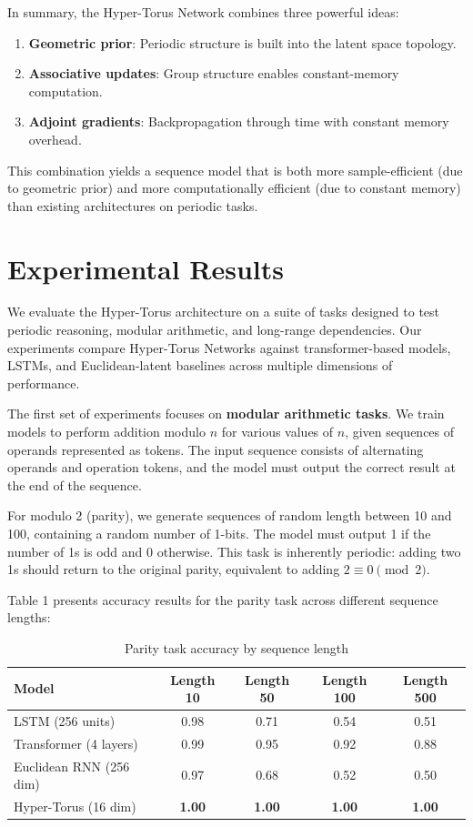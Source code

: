 \documentclass[12pt,letterpaper,twoside]{article}
\begin{document}
In summary, the Hyper-Torus Network combines three powerful ideas:
\begin{enumerate}
    \item \textbf{Geometric prior}: Periodic structure is built into the latent space topology.
    \item \textbf{Associative updates}: Group structure enables constant-memory computation.
    \item \textbf{Adjoint gradients}: Backpropagation through time with constant memory overhead.
\end{enumerate}
This combination yields a sequence model that is both more sample-efficient (due to geometric prior) and more computationally efficient (due to constant memory) than existing architectures on periodic tasks.

\section{Experimental Results}
We evaluate the Hyper-Torus architecture on a suite of tasks designed to test periodic reasoning, modular arithmetic, and long-range dependencies. Our experiments compare Hyper-Torus Networks against transformer-based models, LSTMs, and Euclidean-latent baselines across multiple dimensions of performance.

The first set of experiments focuses on \textbf{modular arithmetic tasks}. We train models to perform addition modulo $n$ for various values of $n$, given sequences of operands represented as tokens. The input sequence consists of alternating operands and operation tokens, and the model must output the correct result at the end of the sequence.

For modulo 2 (parity), we generate sequences of random length between 10 and 100, containing a random number of 1-bits. The model must output 1 if the number of 1s is odd and 0 otherwise. This task is inherently periodic: adding two 1s should return to the original parity, equivalent to adding $2 \equiv 0 \pmod 2$.

Table 1 presents accuracy results for the parity task across different sequence lengths:

\begin{table}[htbp]
    \centering
    \caption{Parity task accuracy by sequence length}
    \label{tab:parity}
    \begin{tabular}{lcccc}
        \hline
        Model & Length 10 & Length 50 & Length 100 & Length 500 \\
        \hline
        LSTM (256 units) & 0.98 & 0.71 & 0.54 & 0.51 \\
        Transformer (4 layers) & 0.99 & 0.95 & 0.92 & 0.88 \\
        Euclidean RNN (256 dim) & 0.97 & 0.68 & 0.52 & 0.50 \\
        Hyper-Torus (16 dim) & \textbf{1.00} & \textbf{1.00} & \textbf{1.00} & \textbf{1.00} \\
        \hline
    \end{tabular}
\end{table}
\end{document}
